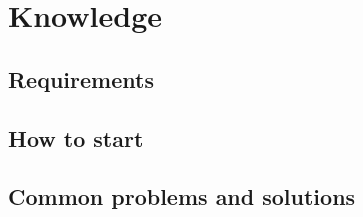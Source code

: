 \documentclass[main.tex]{subfiles}
\begin{document}
	\chapter{Knowledge}
	
	\section{Requirements}
	
	\section{How to start}
	
	\section{Common problems and solutions}
\end{document}

